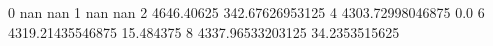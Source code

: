 0 nan nan
1 nan nan
2 4646.40625 342.67626953125
4 4303.72998046875 0.0
6 4319.21435546875 15.484375
8 4337.96533203125 34.2353515625
